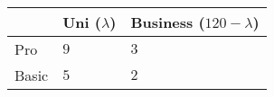 \documentclass[]{standalone}
\begin{document}
\centering
\begin{tabular}{>{\centering\arraybackslash}p{2cm} | >{\centering\arraybackslash}p{2cm} | >{\centering\arraybackslash}p{3cm} }
 & \small Uni ($\lambda$)& \small Business ($120-\lambda$) \\
 \hline
Pro & $9$ & $3$ \\
 \hline
Basic & $5$ & $2$
\end{tabular}
\end{document}
